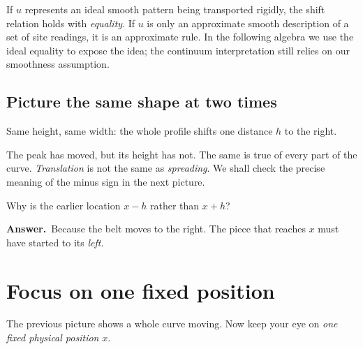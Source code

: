 \documentclass[11pt,a4paper]{article}
\newcommand{\secstart}[1]{\Needspace{7\baselineskip}\section{#1}}
\newcommand{\substart}[1]{\Needspace{5\baselineskip}\subsection{#1}}
\newcommand{\answer}{\par\smallskip\textbf{Answer.}~}
\newcommand{\captionline}[1]{\begin{center}\small\color{muted}#1\end{center}}
\begin{document}
If $u$ represents an ideal smooth pattern being transported rigidly, the shift relation holds with \emph{equality}. If $u$ is only an approximate smooth description of a set of site readings, it is an approximate rule. In the following algebra we use the ideal equality to expose the idea; the continuum interpretation still relies on our smoothness assumption.

\substart{Picture the same shape at two times}
\begin{center}
\end{center}
\captionline{Same height, same width: the whole profile shifts one distance $h$ to the right.}

The peak has moved, but its height has not. The same is true of every part of the curve. \emph{Translation} is not the same as \emph{spreading}. We shall check the precise meaning of the minus sign in the next picture.

\begin{thinkbox}
Why is the earlier location $x-h$ rather than $x+h$?
\answer Because the belt moves to the right. The piece that reaches $x$ must have started to its \emph{left}.
\end{thinkbox}

\clearpage
\secstart{Focus on one fixed position}
The previous picture shows a whole curve moving. Now keep your eye on \emph{one fixed physical position} $x$.
\end{document}
